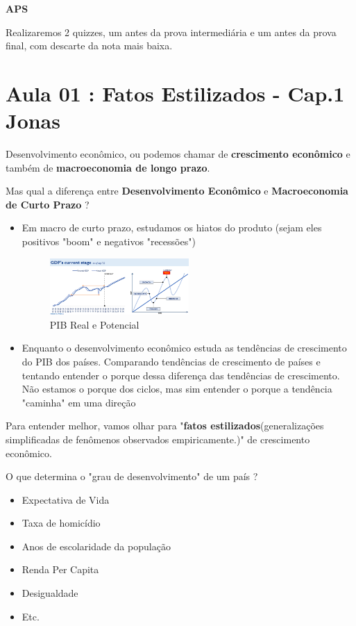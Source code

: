 \documentclass[a4paper,12pt]{article}[abntex2]
\begin{document}
\textbf{APS}

Realizaremos 2 quizzes, um antes da prova intermediária e um antes da prova final, com descarte da nota mais baixa. 

\newpage

\section{\textbf{Aula 01 : Fatos Estilizados - Cap.1 Jonas}}

Desenvolvimento econômico, ou podemos chamar de \textbf{crescimento econômico} e também de \textbf{macroeconomia de longo prazo}. 

Mas qual a diferença entre \textbf{Desenvolvimento Econômico} e \textbf{Macroeconomia de Curto Prazo} ? 
\begin{itemize}
    \item Em macro de curto prazo, estudamos os hiatos do produto (sejam eles positivos "boom" e negativos "recessões")
\begin{figure}[H]
        \centering
        \caption{PIB Real e Potencial} 
        \includegraphics[width=0.5\textwidth]{Imagens/a1i1.png}
        \end{figure}
        \item Enquanto o desenvolvimento econômico estuda as tendências de crescimento do PIB dos países. Comparando tendências de crescimento de países e tentando entender o porque dessa diferença das tendências de crescimento. Não estamos o porque dos ciclos, mas sim entender o porque a tendência "caminha" em uma direção 
\end{itemize}

Para entender melhor, vamos olhar para "\textbf{fatos estilizados}(generalizações simplificadas de fenômenos observados empiricamente.)" de crescimento econômico.

O que determina o "grau de desenvolvimento" de um país ?
\begin{itemize}
    \item Expectativa de Vida
    \item Taxa de homicídio
    \item Anos de escolaridade da população
    \item Renda Per Capita
    \item Desigualdade
    \item Etc.
\end{itemize}
\end{document}
